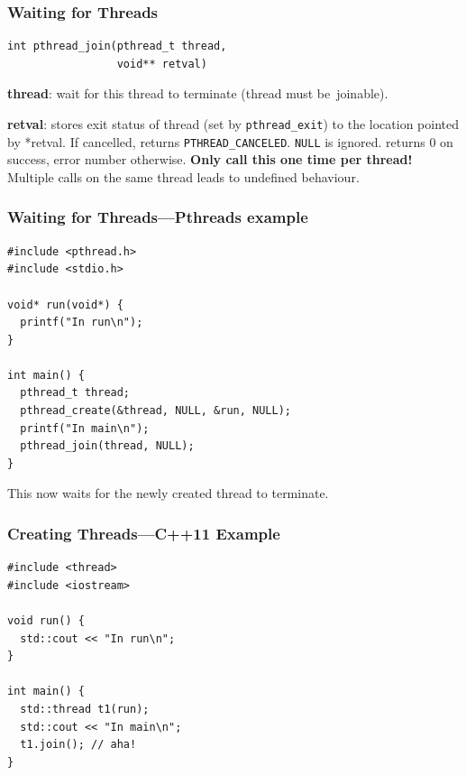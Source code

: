 \begin{frame}[fragile]
  \frametitle{Waiting for Threads}


  \begin{lstlisting}
int pthread_join(pthread_t thread,
                 void** retval)
  \end{lstlisting}
  \vfill
  {\bf thread}: wait for this thread to terminate (thread must be~joinable).

  {\bf retval}: stores exit status of thread (set by {\tt pthread\_exit}) to
                 the location pointed by *retval. If cancelled, returns
                 {\tt PTHREAD\_CANCELED}. {\tt NULL} is ignored.
  \vfill
  returns 0 on success, error number otherwise.
  \vfill
  {\bf Only call this one time per thread!} Multiple calls on the same thread
  leads to undefined behaviour.

\end{frame}

\begin{frame}[fragile]
  \frametitle{Waiting for Threads---Pthreads example}


\begin{lstlisting}
#include <pthread.h>
#include <stdio.h>

void* run(void*) {
  printf("In run\n");
}

int main() {
  pthread_t thread;
  pthread_create(&thread, NULL, &run, NULL);
  printf("In main\n");
  pthread_join(thread, NULL);
}
\end{lstlisting}
  \vfill
  This now waits for the newly created thread to terminate.

\end{frame}

\begin{frame}[fragile]
  \frametitle{Creating Threads---C++11 Example}


\begin{lstlisting}
#include <thread>
#include <iostream>

void run() {
  std::cout << "In run\n";
}

int main() {
  std::thread t1(run);
  std::cout << "In main\n";
  t1.join(); // aha!
}
\end{lstlisting}

\end{frame}

